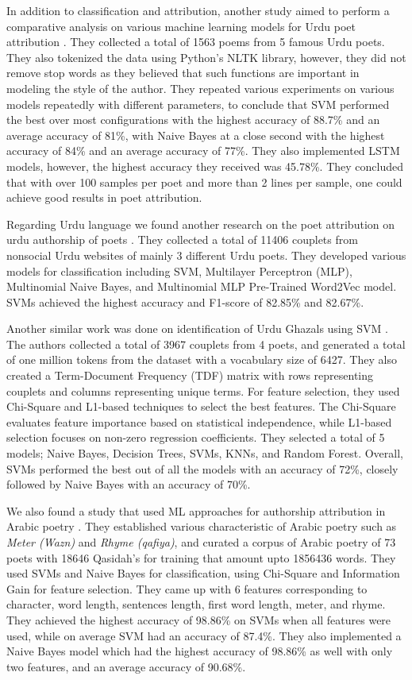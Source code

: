 In addition to classification and attribution, another study aimed to perform a comparative analysis on various machine learning models for Urdu poet attribution \cite{urdu_poet_attribution_kiet}. They collected a total of 1563 poems from 5 famous Urdu poets. They also tokenized the data using Python's NLTK library, however, they did not remove stop words as they believed that such functions are important in modeling the style of the author. They repeated various experiments on various models repeatedly with different parameters, to conclude that SVM performed the best over most configurations with the highest accuracy of 88.7\% and an average accuracy of 81\%, with Naive Bayes at a close second with the highest accuracy of 84\% and an average accuracy of 77\%. They also implemented LSTM models, however, the highest accuracy they received was 45.78\%. They concluded that with over 100 samples per poet and more than 2 lines per sample, one could achieve good results in poet attribution. 

Regarding Urdu language we found another research on the poet attribution on urdu authorship of poets \cite{urdu_authorship_attribution}. They collected a total of 11406 couplets from nonsocial Urdu websites of mainly 3 different Urdu poets. They developed various models for classification including SVM, Multilayer Perceptron (MLP), Multinomial Naive Bayes, and Multinomial MLP Pre-Trained Word2Vec model. SVMs achieved the highest accuracy and F1-score of 82.85\% and 82.67\%. 

Another similar work was done on identification of Urdu Ghazals using SVM \cite{urdu_ghazal_svm}. The authors collected a total of 3967 couplets from 4 poets, and generated a total of one million tokens from the dataset with a vocabulary size of 6427. They also created a Term-Document Frequency (TDF) matrix with rows representing couplets and columns representing unique terms. For feature selection, they used Chi-Square and L1-based techniques to select the best features. The Chi-Square evaluates feature importance based on statistical independence, while L1-based selection focuses on non-zero regression coefficients. They selected a total of 5 models; Naive Bayes, Decision Trees, SVMs, KNNs, and Random Forest. Overall, SVMs performed the best out of all the models with an accuracy of 72\%, closely followed by Naive Bayes with an accuracy of 70\%.

We also found a study that used ML approaches for authorship attribution in Arabic poetry \cite{arabic_poetry_attribution}. They established various characteristic of Arabic poetry such as \textit{Meter (Wazn)} and \textit{Rhyme (qafiya)}, and curated a corpus of Arabic poetry of 73 poets with 18646 Qasidah's for training that amount upto 1856436 words. They used SVMs and Naive Bayes for classification, using Chi-Square and Information Gain for feature selection. They came up with 6 features corresponding to character, word length, sentences length, first word length, meter, and rhyme. They achieved the highest accuracy of 98.86\% on SVMs when all features were used, while on average SVM had an accuracy of 87.4\%. They also implemented a Naive Bayes model which had the highest accuracy of 98.86\% as well with only two features, and an average accuracy of 90.68\%. 

